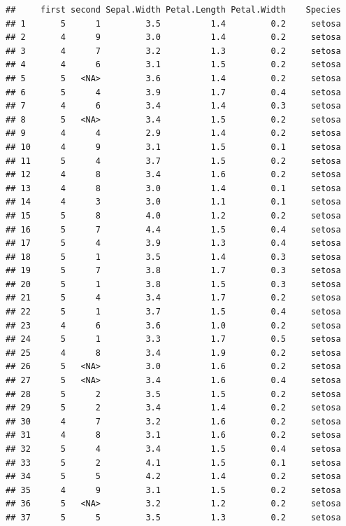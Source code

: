 \documentclass[]{book}
\theoremstyle{definition}
\theoremstyle{definition}
\theoremstyle{definition}
\theoremstyle{remark}
\begin{document}
\begin{verbatim}
##     first second Sepal.Width Petal.Length Petal.Width    Species
## 1       5      1         3.5          1.4         0.2     setosa
## 2       4      9         3.0          1.4         0.2     setosa
## 3       4      7         3.2          1.3         0.2     setosa
## 4       4      6         3.1          1.5         0.2     setosa
## 5       5   <NA>         3.6          1.4         0.2     setosa
## 6       5      4         3.9          1.7         0.4     setosa
## 7       4      6         3.4          1.4         0.3     setosa
## 8       5   <NA>         3.4          1.5         0.2     setosa
## 9       4      4         2.9          1.4         0.2     setosa
## 10      4      9         3.1          1.5         0.1     setosa
## 11      5      4         3.7          1.5         0.2     setosa
## 12      4      8         3.4          1.6         0.2     setosa
## 13      4      8         3.0          1.4         0.1     setosa
## 14      4      3         3.0          1.1         0.1     setosa
## 15      5      8         4.0          1.2         0.2     setosa
## 16      5      7         4.4          1.5         0.4     setosa
## 17      5      4         3.9          1.3         0.4     setosa
## 18      5      1         3.5          1.4         0.3     setosa
## 19      5      7         3.8          1.7         0.3     setosa
## 20      5      1         3.8          1.5         0.3     setosa
## 21      5      4         3.4          1.7         0.2     setosa
## 22      5      1         3.7          1.5         0.4     setosa
## 23      4      6         3.6          1.0         0.2     setosa
## 24      5      1         3.3          1.7         0.5     setosa
## 25      4      8         3.4          1.9         0.2     setosa
## 26      5   <NA>         3.0          1.6         0.2     setosa
## 27      5   <NA>         3.4          1.6         0.4     setosa
## 28      5      2         3.5          1.5         0.2     setosa
## 29      5      2         3.4          1.4         0.2     setosa
## 30      4      7         3.2          1.6         0.2     setosa
## 31      4      8         3.1          1.6         0.2     setosa
## 32      5      4         3.4          1.5         0.4     setosa
## 33      5      2         4.1          1.5         0.1     setosa
## 34      5      5         4.2          1.4         0.2     setosa
## 35      4      9         3.1          1.5         0.2     setosa
## 36      5   <NA>         3.2          1.2         0.2     setosa
## 37      5      5         3.5          1.3         0.2     setosa

\end{verbatim}
\end{document}
